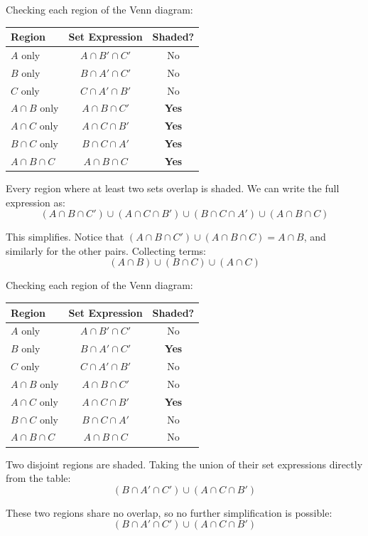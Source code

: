 \documentclass[12pt]{article}
\begin{document}
\begin{stepbox}[Figure (ii)]
Checking each region of the Venn diagram:

\begin{center}
\begin{tabular}{lcc}
\toprule
\textbf{Region} & \textbf{Set Expression} & \textbf{Shaded?} \\
\midrule
$A$ only & $A \cap B' \cap C'$ & No \\
$B$ only & $B \cap A' \cap C'$ & No \\
$C$ only & $C \cap A' \cap B'$ & No \\
\midrule
$A \cap B$ only & $A \cap B \cap C'$ & \textbf{Yes} \\
$A \cap C$ only & $A \cap C \cap B'$ & \textbf{Yes} \\
$B \cap C$ only & $B \cap C \cap A'$ & \textbf{Yes} \\
\midrule
$A \cap B \cap C$ & $A \cap B \cap C$ & \textbf{Yes} \\
\bottomrule
\end{tabular}
\end{center}

Every region where at least two sets overlap is shaded. We can write the full expression as:
\[
(A \cap B \cap C') \cup (A \cap C \cap B') \cup (B \cap C \cap A') \cup (A \cap B \cap C)
\]

This simplifies. Notice that $(A \cap B \cap C') \cup (A \cap B \cap C) = A \cap B$, and similarly for the other pairs. Collecting terms:
\[
\boxed{(A \cap B) \cup (B \cap C) \cup (A \cap C)}
\]
\end{stepbox}

\begin{stepbox}
Checking each region of the Venn diagram:

\begin{center}
\begin{tabular}{lcc}
\toprule
\textbf{Region} & \textbf{Set Expression} & \textbf{Shaded?} \\
\midrule
$A$ only & $A \cap B' \cap C'$ & No \\
$B$ only & $B \cap A' \cap C'$ & \textbf{Yes} \\
$C$ only & $C \cap A' \cap B'$ & No \\
\midrule
$A \cap B$ only & $A \cap B \cap C'$ & No \\
$A \cap C$ only & $A \cap C \cap B'$ & \textbf{Yes} \\
$B \cap C$ only & $B \cap C \cap A'$ & No \\
\midrule
$A \cap B \cap C$ & $A \cap B \cap C$ & No \\
\bottomrule
\end{tabular}
\end{center}

Two disjoint regions are shaded. Taking the union of their set expressions directly from the table:
\[
(B \cap A' \cap C') \cup (A \cap C \cap B')
\]

These two regions share no overlap, so no further simplification is possible:
\[
\boxed{(B \cap A' \cap C') \cup (A \cap C \cap B')}
\]
\end{stepbox}
\end{document}
